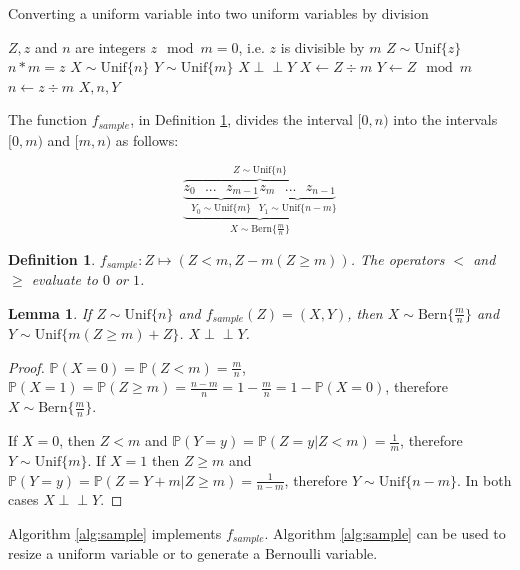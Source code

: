 \documentclass[12pt]{article}
\newtheorem{lemma}{Lemma}
\newtheorem{definition}{Definition}
\newcommand{\indep}{\perp\!\!\!\perp}
\newcommand{\unif}[1]{\mathrm{Unif}\{#1\}}
\newcommand{\bern}[1]{\mathrm{Bern}\{#1\}}
\newcommand{\prob}[1]{\mathbb{P}(#1)}
\begin{document}
\begin{algorithm}
\caption{Converting a uniform variable into two uniform variables by division}
\label{alg:divide}
\begin{algorithmic}[1]
    \Require $Z, z$ and $n$ are integers
    \Require $z \mod m = 0$, i.e. $z$ is divisible by $m$
    \Require $Z \sim \unif{z}$
    \Ensure $n * m = z$
    \Ensure $X \sim \unif{n}$
    \Ensure $Y \sim \unif{m}$
    \Ensure $X \indep Y$
  \State $X \gets Z \div m$
  \State $Y \gets Z \mod m$
  \State $n \gets z \div m$
  \State \Return $X, n, Y$
\EndProcedure
\end{algorithmic}
\end{algorithm}

The function $f_{sample}$, in Definition \ref{def:sample}, divides the interval $[0,n)$ into the intervals $[0,m)$ and $[m, n)$ as follows:

\[
\overbrace{
    \underbrace{
        \underbrace{z_0 \text{   } ... \text{   } z_{m-1}}_{Y_0 \sim \unif{m}}
        \underbrace{z_m \text{   } ... \text{   } z_{n-1}}_{Y_1 \sim \unif{n-m}}}
    }_{X \sim \bern{\frac{m}{n}}}^{Z \sim \unif{n}}
\]

\begin{definition}
$f_{sample}: Z \mapsto (Z<m, Z - m(Z\ge m))$. The operators $<$ and $\ge$ evaluate to $0$ or $1$.
\label{def:sample}
\end{definition}

\begin{lemma}
If $Z \sim \unif{n}$ and $f_{sample}(Z) = (X,Y)$, then $X \sim \bern{\frac{m}{n}}$ and $Y \sim \unif{m(Z \ge m)+Z}$. $X \indep Y$.
\label{lem:sample}
\end{lemma}

\begin{proof}
    $\prob{X=0} = \prob{Z < m} = \frac{m}{n}$, $\prob{X=1} = \prob{Z \ge m} = \frac{n-m}{n} = 1 - \frac{m}{n} = 1 - \prob{X=0}$, therefore $X \sim \bern{\frac{m}{n}}$.

    If $X=0$, then $Z<m$ and $\prob{Y=y} = \prob{Z=y | Z<m} = \frac{1}{m}$, therefore $Y \sim \unif{m}$. If $X=1$ then $Z\ge m$ and $\prob{Y=y} = \prob{Z = Y + m| Z\ge m} = \frac{1}{n-m}$, therefore $Y \sim \unif{n-m}$. In both cases $X \indep Y$.
\end{proof}

Algorithm \ref{alg:sample} implements $f_{sample}$. Algorithm \ref{alg:sample} can be used to resize a uniform variable or to generate a Bernoulli variable.
\end{document}
